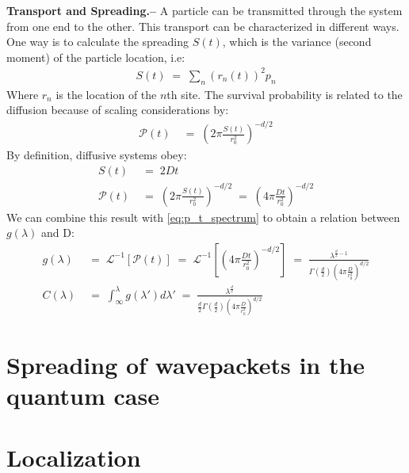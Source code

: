 { \bf Transport and Spreading.--}  %
A particle can be transmitted through the system from one end to the other. This transport can be characterized in different ways. One way is to calculate the spreading $S(t)$, which is the variance (second moment) of the particle location, i.e:
\begin{align}
  S(t) \;=\; \sum_n \left(r_n(t)\right)^2 p_n  %
\end{align}
Where $r_n$ is the location of the $n$th site. The survival probability is related to the diffusion because of scaling considerations by:
\begin{align}
\mathcal{P}(t) &\;=\; \left(2\pi \frac{S(t)}{r_0^2}\right)^{-d/2}
\end{align}
By definition, diffusive systems obey: 
\begin{align}
S(t) &\;=\; 2Dt  \\
\mathcal{P}(t) &\;=\; \left(2\pi \frac{S(t)}{r_0^2}\right)^{-d/2} \;=\; \left(4\pi \frac{Dt}{r_0^2} \right)^{-d/2}
\end{align}
We can combine this result with \ref{eq:p_t_spectrum} to obtain a relation between $g(\lambda)$ and D:
\begin{align}
    g(\lambda) &\;=\; \mathcal{L}^{-1}[\mathcal{P}(t)] \;=\; \mathcal{L}^{-1}\left[ \left(4\pi \frac{Dt}{r_0^2} \right)^{-d/2}\right] \;=\; \frac{\lambda^{\frac{d}{2}-1}}{\Gamma\left(\frac{d}{2}\right)\left(4\pi \frac{D}{r_0^2}\right)^{d/2}}  \\
    C(\lambda) &\;=\; \int_{\infty}^{\lambda} g(\lambda')d\lambda' \;=\; \frac{\lambda^{\frac{d}{2}}}{\frac{d}{2}\Gamma\left(\frac{d}{2}\right)\left(4\pi \frac{D}{r_0^2}\right)^{d/2}}
\label{eq:C_D}
\end{align}


\section{Spreading of wavepackets in the quantum case}

\section{Localization}




